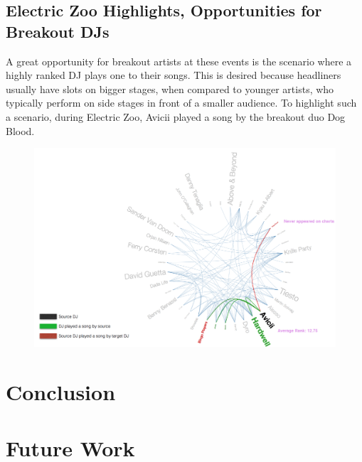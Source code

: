 \documentclass[12pt]{dalcsthesis}
\begin{document}
\section{Electric Zoo Highlights, Opportunities for Breakout DJs}

A great opportunity for breakout artists at these events is the scenario where a highly ranked DJ plays one to their songs. This is desired because headliners usually have slots on bigger stages, when compared to younger artists, who typically perform on side stages in front of a smaller audience. To highlight such a scenario, during Electric Zoo, Avicii played a song by the breakout duo Dog Blood. \newpage

\begin{figure}[h]
\includegraphics[scale=.5]{avicii_dog_blood}
\centering
\end{figure}



\chapter{Conclusion}
\chapter{Future Work}



\end{document}
